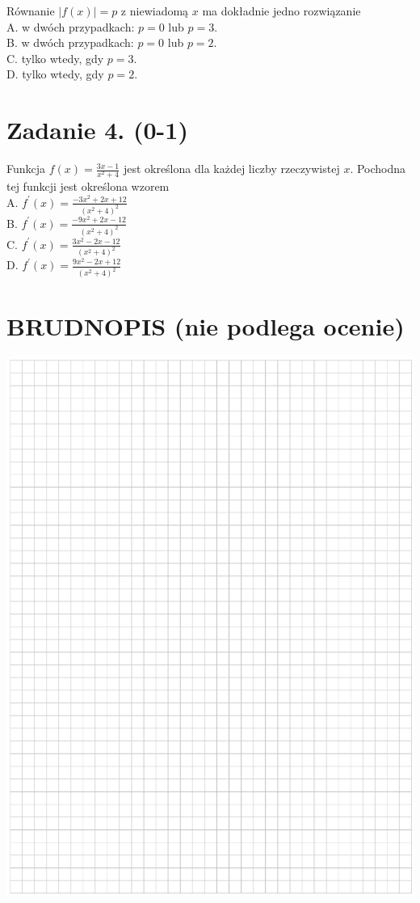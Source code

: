 \documentclass[10pt]{article}
\begin{document}
Równanie \(|f(x)|=p\) z niewiadomą \(x\) ma dokładnie jedno rozwiązanie\\
A. w dwóch przypadkach: \(p=0\) lub \(p=3\).\\
B. w dwóch przypadkach: \(p=0\) lub \(p=2\).\\
C. tylko wtedy, gdy \(p=3\).\\
D. tylko wtedy, gdy \(p=2\).

\section*{Zadanie 4. (0-1)}
Funkcja \(f(x)=\frac{3 x-1}{x^{2}+4}\) jest określona dla każdej liczby rzeczywistej \(x\). Pochodna tej funkcji jest określona wzorem\\
A. \(f^{\prime}(x)=\frac{-3 x^{2}+2 x+12}{\left(x^{2}+4\right)^{2}}\)\\
B. \(f^{\prime}(x)=\frac{-9 x^{2}+2 x-12}{\left(x^{2}+4\right)^{2}}\)\\
C. \(f^{\prime}(x)=\frac{3 x^{2}-2 x-12}{\left(x^{2}+4\right)^{2}}\)\\
D. \(f^{\prime}(x)=\frac{9 x^{2}-2 x+12}{\left(x^{2}+4\right)^{2}}\)

\section*{BRUDNOPIS (nie podlega ocenie)}
\begin{center}
\includegraphics[max width=\textwidth]{2024_11_21_054c332d5c02f869c372g-03}
\end{center}
\end{document}
